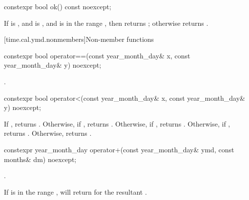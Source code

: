 %
\begin{itemdecl}
constexpr bool ok() const noexcept;
\end{itemdecl}

\begin{itemdescr}
\pnum
\returns
If  is ,
and  is ,
and  is in the range ,
then returns ; otherwise returns .
\end{itemdescr}

[time.cal.ymd.nonmembers]{Non-member functions}

%
\begin{itemdecl}
constexpr bool operator==(const year_month_day& x, const year_month_day& y) noexcept;
\end{itemdecl}

\begin{itemdescr}
\pnum
\returns {}.
\end{itemdescr}

%
\begin{itemdecl}
constexpr bool operator<(const year_month_day& x, const year_month_day& y) noexcept;
\end{itemdecl}

\begin{itemdescr}
\pnum
\returns
If , returns .
Otherwise, if , returns .
Otherwise, if , returns .
Otherwise, if , returns .
Otherwise, returns .
\end{itemdescr}

%
\begin{itemdecl}
constexpr year_month_day operator+(const year_month_day& ymd, const months& dm) noexcept;
\end{itemdecl}

\begin{itemdescr}
\pnum
\returns {}.

\pnum
\begin{note}
If  is in the range ,
 will return  for
the resultant .
\end{note}
\end{itemdescr}

